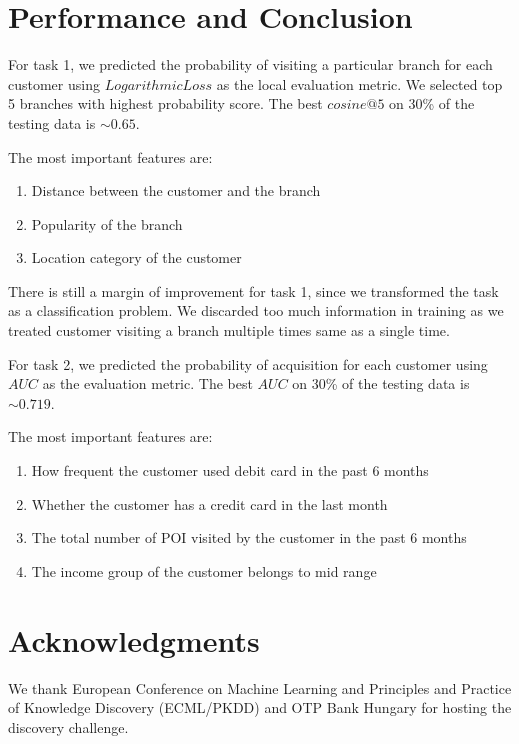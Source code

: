 \documentclass[a4paper]{llncs}
\begin{document}
\section{Performance and Conclusion}
For task 1, we predicted the probability of visiting a particular branch for each customer using $Logarithmic Loss$ as the local evaluation metric.
 We selected top 5 branches with highest probability score. The best $cosine@5$ on 30\% of the testing data is $\sim0.65$.

The most important features are:

\begin{enumerate}
 \item Distance between the customer and the branch
 \item Popularity of the branch
 \item Location category of the customer

\end{enumerate}

There is still a margin of improvement for task 1, since we transformed the task as a classification problem.
 We discarded too much information in training as we treated customer visiting a branch multiple times same as a single time.

For task 2, we predicted the probability of acquisition for each customer using $AUC$ as the evaluation metric.
The best $AUC$ on 30\% of the testing data is $\sim0.719$.

The most important features are:

\begin{enumerate}
 \item How frequent the customer used debit card in the past 6 months

 \item Whether the customer has a credit card in the last month

 \item The total number of POI visited by the customer in the past 6 months

 \item The income group of the customer belongs to mid range
\end{enumerate}

\section{Acknowledgments}
We thank European Conference on Machine Learning and Principles and Practice of Knowledge Discovery (ECML/PKDD)
and OTP Bank Hungary for hosting the discovery challenge.





\end{document}
